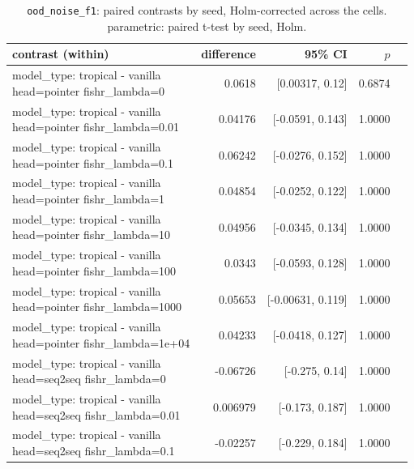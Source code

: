 \documentclass[10pt]{article}
\makeatletter
\newcommand{\stackcell}[1]{\begin{tabular}[t]{@{}l@{}}#1\end{tabular}}
\makeatother
\begin{document}
{\small
\begin{longtable}{lrrrl}
\caption{\texttt{ood\_noise\_f1}: paired contrasts by seed, Holm-corrected across the cells. parametric: paired t-test by seed, Holm.}\label{tab:paired-ood_noise_f1}\\
\toprule
contrast (within) & difference & 95\% CI & $p$ & \\
\midrule
\endhead
\stackcell{model\_type: tropical - vanilla\\\footnotesize head=pointer fishr\_lambda=0 } & 0.0618 & [0.00317, 0.12] & 0.6874 & \\
\stackcell{model\_type: tropical - vanilla\\\footnotesize head=pointer fishr\_lambda=0.01 } & 0.04176 & [-0.0591, 0.143] & 1.0000 & \\
\stackcell{model\_type: tropical - vanilla\\\footnotesize head=pointer fishr\_lambda=0.1 } & 0.06242 & [-0.0276, 0.152] & 1.0000 & \\
\stackcell{model\_type: tropical - vanilla\\\footnotesize head=pointer fishr\_lambda=1 } & 0.04854 & [-0.0252, 0.122] & 1.0000 & \\
\stackcell{model\_type: tropical - vanilla\\\footnotesize head=pointer fishr\_lambda=10 } & 0.04956 & [-0.0345, 0.134] & 1.0000 & \\
\stackcell{model\_type: tropical - vanilla\\\footnotesize head=pointer fishr\_lambda=100 } & 0.0343 & [-0.0593, 0.128] & 1.0000 & \\
\stackcell{model\_type: tropical - vanilla\\\footnotesize head=pointer fishr\_lambda=1000 } & 0.05653 & [-0.00631, 0.119] & 1.0000 & \\
\stackcell{model\_type: tropical - vanilla\\\footnotesize head=pointer fishr\_lambda=1e+04 } & 0.04233 & [-0.0418, 0.127] & 1.0000 & \\
\stackcell{model\_type: tropical - vanilla\\\footnotesize head=seq2seq fishr\_lambda=0 } & -0.06726 & [-0.275, 0.14] & 1.0000 & \\
\stackcell{model\_type: tropical - vanilla\\\footnotesize head=seq2seq fishr\_lambda=0.01 } & 0.006979 & [-0.173, 0.187] & 1.0000 & \\
\stackcell{model\_type: tropical - vanilla\\\footnotesize head=seq2seq fishr\_lambda=0.1 } & -0.02257 & [-0.229, 0.184] & 1.0000 & \\

\end{longtable}}
\end{document}
